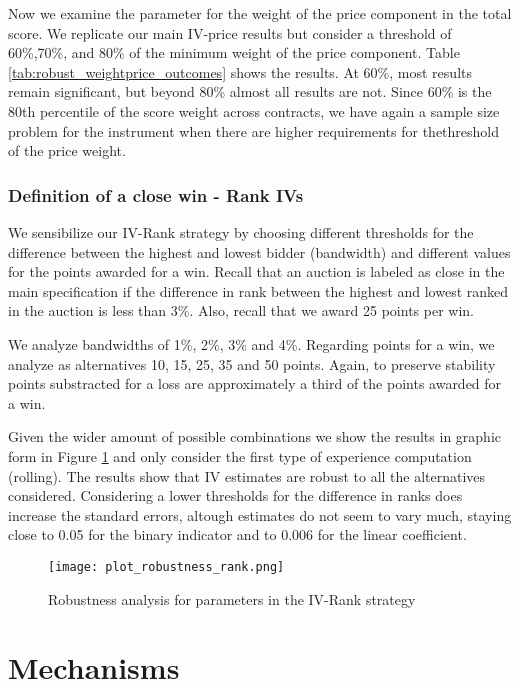 Now we examine the parameter for the weight of the price component in the total score. We replicate our main IV-price results but consider a threshold of 60\%,70\%, and 80\% of the minimum weight of the price component. Table \ref{tab:robust_weightprice_outcomes} shows the results. At 60\%, most results remain significant, but beyond 80\% almost all results are not. Since 60\% is the 80th percentile of the score weight across contracts, we have again a sample size problem for the instrument when there are higher requirements for thethreshold of the price weight.



\subsection{Definition of a close win - Rank IVs}

We sensibilize our IV-Rank strategy by choosing different thresholds for the difference between the highest and lowest bidder (bandwidth) and different values for the points awarded for a win. Recall that an auction is labeled as close in the main specification if the difference in rank between the highest and lowest ranked in the auction is less than 3\%. Also, recall that we award 25 points per win.

We analyze bandwidths of 1\%, 2\%, 3\% and 4\%. Regarding points for a win, we analyze as alternatives 10, 15, 25, 35 and 50 points. Again, to preserve stability points substracted for a loss are approximately a third of the points awarded for a win.

Given the wider amount of possible combinations we show the results in graphic form in Figure \ref{fig:plot_robustness_rank} and only consider the first type of experience computation (rolling). The results show that IV estimates are robust to all the alternatives considered. Considering a lower thresholds for the difference in ranks does increase the standard errors, altough estimates do not seem to vary much, staying close to 0.05 for the binary indicator and to 0.006 for the linear coefficient.

\begin{figure}[H]
  \texttt{[image: plot\_robustness\_rank.png]}
  \caption{Robustness analysis for parameters in the IV-Rank strategy}
  \label{fig:plot_robustness_rank}
\end{figure}

\chapter{Mechanisms}

